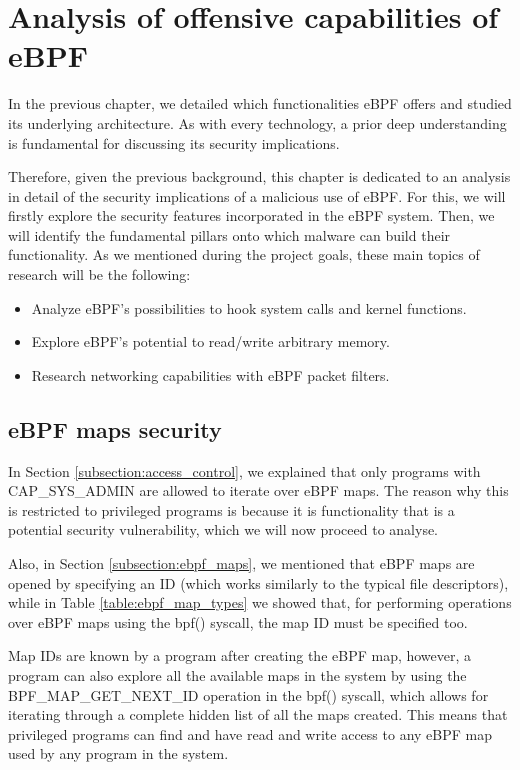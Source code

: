 \chapter{Analysis of offensive capabilities of eBPF} \label{chapter:analysis_offensive_capabilities}
In the previous chapter, we detailed which functionalities eBPF offers and studied its underlying architecture. As with every technology, a prior deep understanding is fundamental for discussing its security implications. 

Therefore, given the previous background, this chapter is dedicated to an analysis in detail of the security implications of a malicious use of eBPF. For this, we will firstly explore the security features incorporated in the eBPF system. Then, we will identify the fundamental pillars onto which malware can build their functionality. As we mentioned during the project goals, these main topics of research will be the following:
\begin{itemize}
\item Analyze eBPF's possibilities to hook system calls and kernel
functions.
\item Explore eBPF's potential to read/write arbitrary memory.
\item Research networking capabilities with eBPF packet filters.
\end{itemize}


\section{eBPF maps security}
In Section \ref{subsection:access_control}, we explained that only programs with CAP\_SYS\_ADMIN are allowed to iterate over eBPF maps. The reason why this is restricted to privileged programs is because it is functionality that is a potential security vulnerability, which we will now proceed to analyse.

Also, in Section \ref{subsection:ebpf_maps}, we mentioned that eBPF maps are opened by specifying an ID (which works similarly to the typical file descriptors), while in Table \ref{table:ebpf_map_types} we showed that, for performing operations over eBPF maps using the bpf() syscall, the map ID must be specified too. 

Map IDs are known by a program after creating the eBPF map, however, a program can also explore all the available maps in the system by using the BPF\_MAP\_GET\_NEXT\_ID operation in the bpf() syscall, which allows for iterating through a complete hidden list of all the maps created. This means that privileged programs can find and have read and write access to any eBPF map used by any program in the system.

